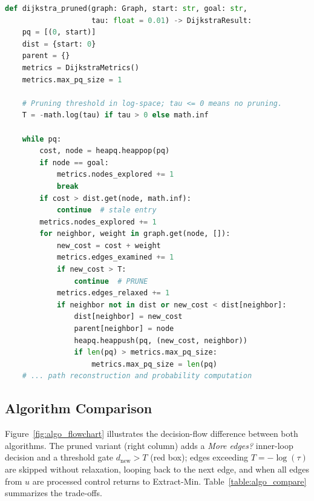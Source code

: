 \begin{lstlisting}[language=Python, caption={Pruned Dijkstra implementation (\texttt{src/dijkstra.py})}, label=lst:pruned_impl]
def dijkstra_pruned(graph: Graph, start: str, goal: str,
                    tau: float = 0.01) -> DijkstraResult:
    pq = [(0, start)]
    dist = {start: 0}
    parent = {}
    metrics = DijkstraMetrics()
    metrics.max_pq_size = 1

    # Pruning threshold in log-space; tau <= 0 means no pruning.
    T = -math.log(tau) if tau > 0 else math.inf

    while pq:
        cost, node = heapq.heappop(pq)
        if node == goal:
            metrics.nodes_explored += 1
            break
        if cost > dist.get(node, math.inf):
            continue  # stale entry
        metrics.nodes_explored += 1
        for neighbor, weight in graph.get(node, []):
            new_cost = cost + weight
            metrics.edges_examined += 1
            if new_cost > T:
                continue  # PRUNE
            metrics.edges_relaxed += 1
            if neighbor not in dist or new_cost < dist[neighbor]:
                dist[neighbor] = new_cost
                parent[neighbor] = node
                heapq.heappush(pq, (new_cost, neighbor))
                if len(pq) > metrics.max_pq_size:
                    metrics.max_pq_size = len(pq)
    # ... path reconstruction and probability computation
\end{lstlisting}

\subsection{Algorithm Comparison}

Figure~\ref{fig:algo_flowchart} illustrates the decision-flow difference between both algorithms. The pruned variant (right column) adds a \emph{More edges?} inner-loop decision and a threshold gate $d_{\text{new}}>T$ (red box); edges exceeding $T=-\log(\tau)$ are skipped without relaxation, looping back to the next edge, and when all edges from $u$ are processed control returns to Extract-Min. Table~\ref{table:algo_compare} summarizes the trade-offs.


